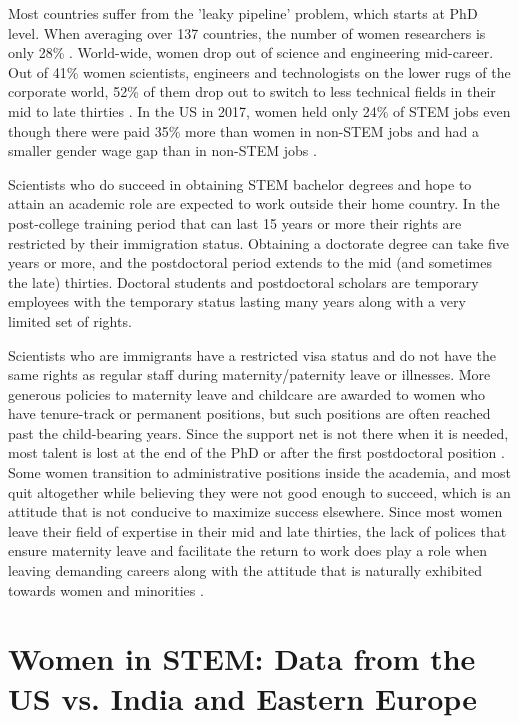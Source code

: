 \documentclass[utf8]{frontiersSCNS} %
\begin{document}
Most countries suffer from the 'leaky pipeline' problem, which starts at PhD level. When averaging over 137 countries, the number of women researchers is only 28\% \citep{huyer2015gender}. World-wide,  women drop out of science and engineering mid-career. Out of 41\% women scientists, engineers and technologists on the lower rugs of the corporate world, 52\% of them drop out to switch to less technical fields in their mid to late thirties \citep{hewlett2008athena}. In the US in 2017, women held only 24\% of STEM jobs even though there were paid 35\% more than women in non-STEM jobs and had a smaller gender wage gap than in non-STEM jobs \citep{womenSTEM}.

Scientists who do succeed in obtaining STEM bachelor degrees and hope to attain an academic role are expected to work outside their home country. In the post-college training period that can last 15 years or more their rights are restricted by their immigration status. Obtaining a doctorate degree can take five years or more, and the postdoctoral period extends to the mid (and sometimes the late) thirties. Doctoral students and postdoctoral scholars are temporary employees with the temporary status lasting many years along with a very limited set of rights. 

Scientists who are immigrants have a restricted visa status and do not have the same rights as regular staff during maternity/paternity leave or illnesses.   More generous policies to maternity leave and childcare are awarded to women who have tenure-track or permanent positions, but such positions are often reached past the child-bearing years. Since the support net is not there when it is needed, most talent is lost at the end of the PhD or after the first postdoctoral position \citep{huyer2015gender}. Some women transition to administrative positions inside the academia, and most quit altogether while believing they were not good enough to succeed, which is an attitude that is not conducive to maximize success elsewhere. Since most women leave their field of expertise in their mid and late thirties, the lack of polices that ensure maternity leave and facilitate the return to work does play a role when leaving demanding careers \citep{rangel2018factors} along with the attitude that is naturally exhibited towards women and minorities \citep{national2018sexual}.  

\section{Women in STEM: Data from the US vs. India and Eastern Europe}
\label{Sec4}
\end{document}
